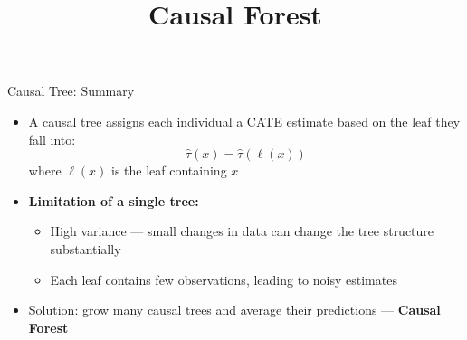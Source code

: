 \documentclass[hyperref={pdfpagelabels=false}]{beamer}
\begin{document}
\begin{frame}{Causal Tree: Summary}
	\begin{itemize}
		\item A causal tree assigns each individual a CATE estimate based on the leaf they fall into:
		\begin{equation*}
			\hat{\tau}(x) = \hat{\tau}(\ell(x))
		\end{equation*}
		where $\ell(x)$ is the leaf containing $x$
		\vspace{0.3cm}
		\item \textbf{Limitation of a single tree:}
		\vspace{0.2cm}
		\begin{itemize}
			\item High variance --- small changes in data can change the tree structure substantially
			\vspace{0.2cm}
			\item Each leaf contains few observations, leading to noisy estimates
		\end{itemize}
		\vspace{0.3cm}
		\item Solution: grow many causal trees and average their predictions --- \textbf{Causal Forest}
	\end{itemize}
\end{frame}




\title[]
{Causal Forest}

\author{}
\institute{}
\date{}

\begin{frame}{}
	\titlepage
\end{frame}
\end{document}
